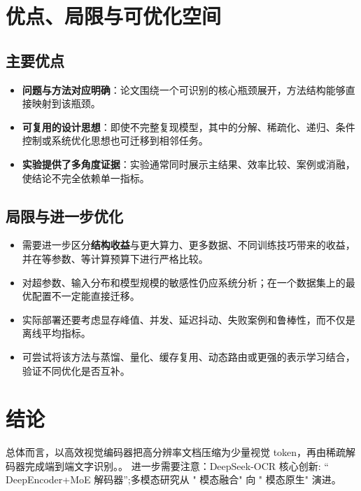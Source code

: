 \documentclass[UTF8,11pt,a4paper]{ctexart}
\newcommand{\term}[1]{\textbf{\textcolor{mainblue}{#1}}}
\begin{document}
\section{优点、局限与可优化空间}
\subsection{主要优点}
\begin{itemize}
\item \term{问题与方法对应明确}：论文围绕一个可识别的核心瓶颈展开，方法结构能够直接映射到该瓶颈。
\item \term{可复用的设计思想}：即使不完整复现模型，其中的分解、稀疏化、递归、条件控制或系统优化思想也可迁移到相邻任务。
\item \term{实验提供了多角度证据}：实验通常同时展示主结果、效率比较、案例或消融，使结论不完全依赖单一指标。
\end{itemize}

\subsection{局限与进一步优化}
\begin{itemize}
\item 需要进一步区分\term{结构收益}与更大算力、更多数据、不同训练技巧带来的收益，并在等参数、等计算预算下进行严格比较。
\item 对超参数、输入分布和模型规模的敏感性仍应系统分析；在一个数据集上的最优配置不一定能直接迁移。
\item 实际部署还要考虑显存峰值、并发、延迟抖动、失败案例和鲁棒性，而不仅是离线平均指标。
\item 可尝试将该方法与蒸馏、量化、缓存复用、动态路由或更强的表示学习结合，验证不同优化是否互补。
\end{itemize}

\section{结论}
总体而言，以高效视觉编码器把高分辨率文档压缩为少量视觉 token，再由稀疏解码器完成端到端文字识别。。 进一步需要注意：DeepSeek-OCR 核心创新: “ DeepEncoder+MoE 解码器”;多模态研究从 " 模态融合" 向 " 模态原生" 演进。
\end{document}
